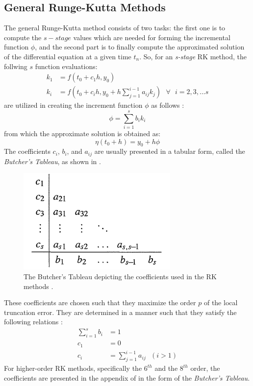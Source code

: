 \subsection{General Runge-Kutta Methods}
The general Runge-Kutta method consists of two tasks: the first one is to compute the $s-stage$ values which are needed for forming the incremental function $\phi$, and the second part is to finally compute the approximated solution of the differential equation at a given time $t_n$. So, for an \textit{s-stage} \gls{RK} method, the follwing $s$ function evaluations:
\begin{align}
k_1 &= f(t_0 + c_1h, y_0) \\
k_i &= f(t_0 + c_ih, y_0 + h \sum_{j=1}^{i-1}a_{ij}k_j) \text{ } \forall \text{ } i = 2, 3, ...s
\end{align}
%
are utilized in creating the increment function $\phi$ as follows \cite{gillbook}:
\begin{equation}
\label{phi_general}
\phi = \sum_{i=1}^{s} b_ik_i
\end{equation}
%
from which the approximate solution is obtained as:
\begin{equation}
\eta(t_0 + h) = y_0 + h\phi
\end{equation}
%
The coefficients $c_i$, $b_i$, and $a_{ij}$ are usually presented in a tabular form, called the \textit{Butcher's Tableau}, as shown in  \cite{gillbook}.
%
\begin{figure}[h]
\centering
\captionsetup{justification=centering}
\includegraphics[scale=1]{rk_tab.png}
\caption{The Butcher's Tableau depicting the coefficients used in the \gls{RK} methods \cite{gillbook}.}
\label{fig:rk_tab}
\end{figure}
%
These coefficients are chosen such that they maximize the order $p$ of the local truncation error. They are determined in a manner such that they satisfy the following relations \cite{gillbook}:
\begin{align}
\sum_{i=1}^{s} b_i &= 1\\
c_1 &= 0 \\
c_i &= \sum_{j=1}^{i-1}a_{ij} \text{   } (i>1)
\end{align}
%
For higher-order \gls{RK} methods, specifically the $6^{th}$ and the $8^{th}$ order, the coefficients are presented in the appendix of \cite{jstor} in the form of the \textit{Butcher's Tableau}.

